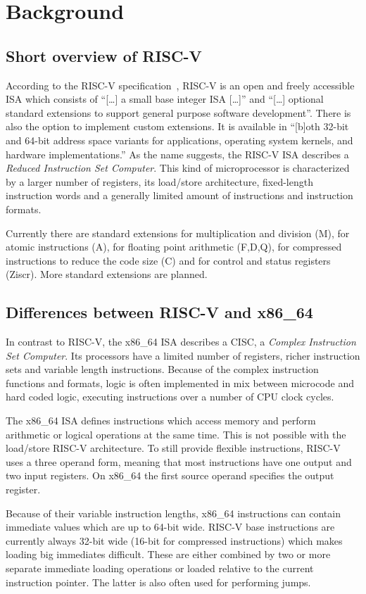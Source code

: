 \documentclass[course=eragp]{aspdoc}
\begin{document}
\section{Background}
\subsection{Short overview of RISC-V}

According to the RISC-V specification~\cite{rvspec}, RISC-V is an open and freely accessible ISA
which consists of ``[\ldots] a small base integer ISA [\ldots]'' and ``[\ldots] optional standard
extensions to support general purpose software development''\cite[p.~1]{rvspec}. There is also
the option to implement custom extensions. It is available in
``[b]oth 32-bit and 64-bit address space variants for applications, operating system kernels, and
hardware implementations.''\cite[p.~1]{rvspec} As the name suggests, the RISC-V ISA describes a
\emph{Reduced Instruction Set Computer}. This kind of microprocessor is characterized by a larger
number of registers, its load/store architecture, fixed-length instruction words and a generally
limited amount of instructions and instruction formats.\cite{RISCvCISC}
\par
Currently there are standard extensions for multiplication and division (M), for atomic instructions (A),
for floating point arithmetic (F,D,Q), for compressed instructions to reduce the code size (C) and
for control and status registers (Ziscr). More standard extensions are planned.

\subsection{Differences between RISC-V and x86\_64}
In contrast to RISC-V, the x86\_64 ISA describes a CISC, a \emph{Complex Instruction Set Computer}.
Its processors have a limited number of registers, richer instruction sets and variable length
instructions. Because of the complex instruction functions and formats, logic is often implemented
in mix between microcode and hard coded logic, executing instructions over a number of CPU clock
cycles.\cite{RISCvCISC}
\par
The x86\_64 ISA defines instructions which access memory and perform arithmetic or logical
operations at the same time. This is not possible with the load/store RISC-V architecture. To still
provide flexible instructions, RISC-V uses a three operand form, meaning that most instructions have
one output and two input registers. On x86\_64 the first source operand specifies the output
register.
\par
Because of their variable instruction lengths, x86\_64 instructions can contain immediate
values which are up to 64-bit wide.\cite[Vol.~2B~p.~4-35]{intel2017man} RISC-V base instructions are
currently always 32-bit wide (16-bit for compressed instructions)\cite[p.~8]{rvspec} which makes
loading big immediates difficult. These are either combined by two or more separate immediate
loading operations or loaded relative to the current instruction pointer.\cite[p.~19]{rvspec} The
latter is also often used for performing jumps.\cite [p.~20]{rvspec}
\end{document}
